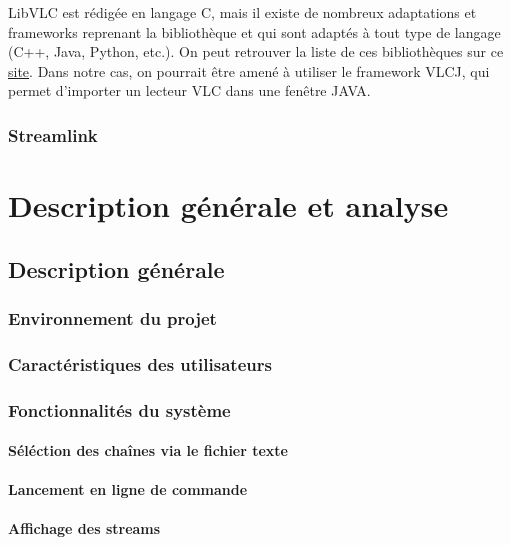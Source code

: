 \documentclass{polytech/polytech}
\begin{document}
LibVLC est rédigée en langage C, mais il existe de nombreux adaptations et frameworks reprenant la bibliothèque et qui sont adaptés à tout type de langage (C++, Java, Python, etc.). On peut retrouver la liste de ces bibliothèques sur ce \href{https://wiki.videolan.org/LibVLC/}{site}. Dans notre cas, on pourrait être amené à utiliser le framework VLCJ, qui permet d’importer un lecteur VLC dans une fenêtre JAVA.


\section{Streamlink}


\part{Description générale et analyse}


\chapter{Description générale}


\section{Environnement du projet}

\section{Caractéristiques des utilisateurs}


\section{Fonctionnalités du système}


\subsection{Séléction des chaînes via le fichier texte}

\subsection{Lancement en ligne de commande}

\subsection{Affichage des streams}
\end{document}
